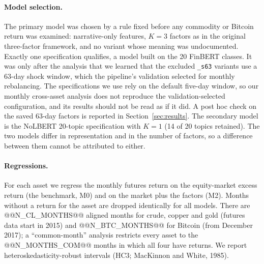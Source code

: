 \documentclass[11pt]{article}
\begin{document}
\paragraph{Model selection.} The primary model was chosen by a rule fixed before any commodity or Bitcoin return was examined: narrative-only features, $K=3$ factors as in the original three-factor framework, and no variant whose meaning was undocumented. Exactly one specification qualifies, a model built on the 20 FinBERT classes. It was only after the analysis that we learned that the excluded \texttt{\_s63} variants use a 63-day shock window, which the pipeline's validation selected for monthly rebalancing. The specifications we use rely on the default five-day window, so our monthly cross-asset analysis does not reproduce the validation-selected configuration, and its results should not be read as if it did. A post hoc check on the saved 63-day factors is reported in Section~\ref{sec:results}. The secondary model is the NoLBERT 20-topic specification with $K=1$ (14 of 20 topics retained). The two models differ in representation and in the number of factors, so a difference between them cannot be attributed to either.

\paragraph{Regressions.} For each asset we regress the monthly futures return on the equity-market excess return (the benchmark, M0) and on the market plus the factors (M2). Months without a return for the asset are dropped identically for all models. There are @@N_CL_MONTHS@@ aligned months for crude, copper and gold (futures data start in 2015) and @@N_BTC_MONTHS@@ for Bitcoin (from December 2017); a ``common-month'' analysis restricts every asset to the @@N_MONTHS_COM@@ months in which all four have returns. We report heteroskedasticity-robust intervals (HC3; MacKinnon and White, 1985).
\end{document}
